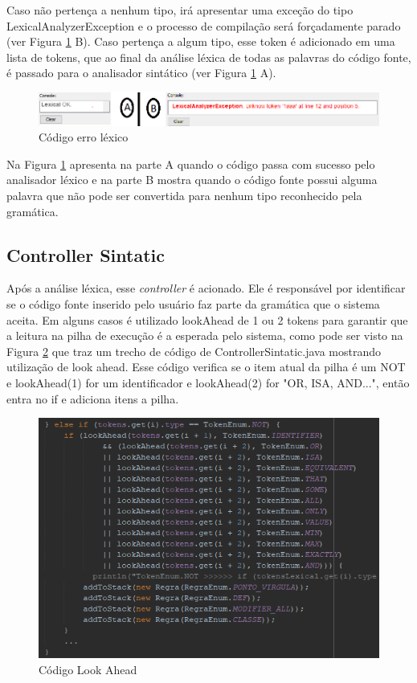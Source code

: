 \documentclass{bcc}
\begin{document}
Caso não pertença a nenhum tipo, irá apresentar uma exceção do tipo LexicalAnalyzerException e o processo de compilação será forçadamente parado (ver Figura \ref{fig:codigoErroLexico} B). Caso pertença a algum tipo, esse token é adicionado em uma lista de tokens, que ao final da análise léxica de todas as palavras do código fonte, é passado para o analisador sintático (ver Figura \ref{fig:codigoErroLexico} A).

\begin{figure}[H]
\centering
\includegraphics[width=.7\textwidth]{Figuras/codigo_erro_lexico.png}
\caption{Código erro léxico}
\label{fig:codigoErroLexico}
\end{figure}

Na Figura \ref{fig:codigoErroLexico} apresenta na parte A quando o código passa com sucesso pelo analisador léxico e na parte B mostra quando o código fonte possui alguma palavra que não pode ser convertida para nenhum tipo reconhecido pela gramática.

\subsection{Controller Sintatic}

Após a análise léxica, esse \textit{controller} é acionado. Ele é responsável por identificar se o código fonte inserido pelo usuário faz parte da gramática que o sistema aceita. Em alguns casos é utilizado lookAhead de 1 ou 2 tokens para garantir que a leitura na pilha de execução é a esperada pelo sistema, como pode ser visto na Figura \ref{fig:codigoLookAhead} que traz um trecho de código de ControllerSintatic.java mostrando utilização de look ahead. Esse código verifica se o item atual da pilha é um NOT e lookAhead(1) for um identificador e lookAhead(2) for "OR, ISA, AND...", então entra no if e adiciona itens a pilha.

\begin{figure}[H]
\centering
\includegraphics[width=.8\textwidth]{Figuras/codigo_lookahead.png}
\caption{Código Look Ahead}
\label{fig:codigoLookAhead}
\end{figure}
\end{document}

